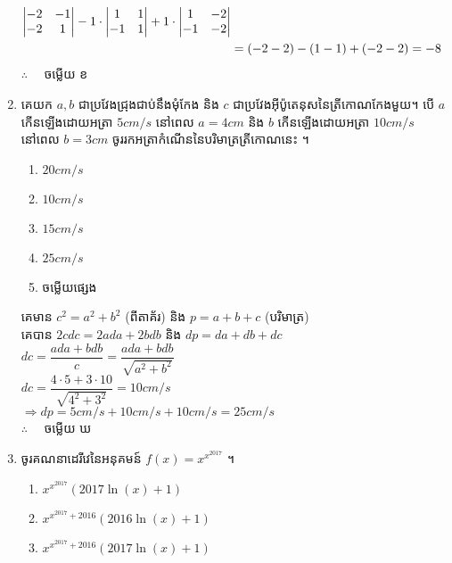 \documentclass[12pt, a4paper]{article}
\begin{document}
\begin{enumerate}[m]
\begin{center}
\begin{eqnarray*}
\begin{vmatrix}
				-2 & -1\\ 
				-2 & 1 \notag
			\end{vmatrix}
			-1\cdot
			\begin{vmatrix}
				1 & 1\\ 
				-1 & 1 \notag
			\end{vmatrix}
			+1\cdot
			\begin{vmatrix}
				1 & -2\\ 
				-1 & -2 \notag
			\end{vmatrix}\\
			&=\left(-2-2\right)-\left(1-1\right)+\left(-2-2\right)=-8\\
		\end{eqnarray*}
		$\therefore \quad$ \kml ចម្លើយ \kbk ខ
	\end{center}
	{\color{blue}\hrulefill}
	\item គេយក $a,b$ ជាប្រវែងជ្រុងជាប់នឹងមុំកែង និង $c$ ជាប្រវែងអ៊ីប៉ូតេនុសនៃត្រីកោណកែងមួយ។ បើ $a$ កើនឡើងដោយអត្រា $5 cm/s$ នៅពេល $a=4cm$ និង $b$ កើនឡើងដោយអត្រា $10 cm/s$ នៅពេល $b=3cm$ ចូររកអត្រាកំណើននៃបរិមាត្រត្រីកោណនេះ ។
	\begin{enumerate}[k,5]
		\item $20 cm/s$
		\item $10 cm/s$
		\item $15 cm/s$
		\item $25 cm/s$
		\item ចម្លើយផ្សេង
	\end{enumerate}
	\answer
	\begin{center}
		គេមាន $c^2=a^2+b^2$ (ពីតាគ័រ) និង $p=a+b+c$ (បរិមាត្រ)\\
		គេបាន $2cdc=2ada+2bdb$ និង $dp=da+db+dc$\\
		$dc=\dfrac{ada+bdb}{c}=\dfrac{ada+bdb}{\sqrt{a^2+b^2}}$\\
		$dc=\dfrac{4\cdot5+3\cdot10}{\sqrt{4^2+3^2}}=10cm/s$\\
		$\Rightarrow dp=5cm/s+10cm/s+10cm/s=25cm/s$\\
		$\therefore \quad$ \kml ចម្លើយ \kbk ឃ
	\end{center}
	{\color{blue}\hrulefill}
	\item ចូរគណនាដេរីវេនៃអនុគមន៍ $f(x)=x^{x^{2017}}$ ។
	\begin{enumerate}[k,2]
		\item $x^{x^{2017}}\left(2017\ln\left(x\right)+1\right)$
		\item $x^{x^{2017}+2016}\left(2016\ln\left(x\right)+1\right)$
		\item $x^{x^{2017}+2016}\left(2017\ln\left(x\right)+1\right)$

\end{enumerate}
\end{enumerate}
\end{document}
